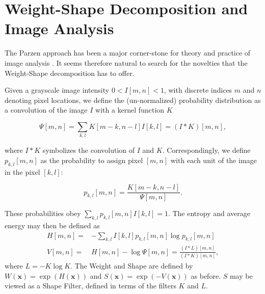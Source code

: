 \documentclass[preprint,12pt]{elsarticle}
\begin{document}
\section{Weight-Shape Decomposition and Image Analysis}
\label{image}
The Parzen approach has been a major corner-stone for theory and practice of image analysis \cite{lindeberg1994}. It seems therefore natural to search for the novelties that the Weight-Shape decomposition has to offer.

Given a grayscale image intensity $0< I[m, n] <1$, with discrete indices $m$ and $n$ denoting pixel locations,  we define the (un-normalized) probability distribution as a convolution of the image $I$ with a kernel function $K$

\begin{equation}\label{psi_image}
  \Psi[m,n]=\sum_{k,l}K[m-k,n-l]I[k,l]=\left(I\ast K\right)[m,n],
\end{equation}

where $I\ast K$ symbolizes the convolution of $I$ and $K$. Correspondingly, we define $p_{k,l}[m,n]$ as the probability to assign pixel $[m,n]$ with each unit of the image in the pixel $[k,l]$:

\begin{equation}\label{prob_image}
  p_{k,l}[m,n]=\frac{K[m-k,n-l]}{\Psi[m,n]}.
\end{equation}

These probabilities obey $\sum_{k,l}p_{k,l}[m,n]I[k,l]=1$. The entropy and average energy may then be defined as
\begin{equation}\label{H_V_image}
\begin{aligned}
  H[m,n]=&-\sum_{k,l}I[k,l]p_{k,l}[m,n]\log p_{k,l}[m,n]\\
  V[m,n]=&H[m,n]-\log \Psi[m,n]=\frac{\left(I\ast L\right)[m,n]}{\left(I\ast K\right)[m,n]},
\end{aligned}
\end{equation}
where $L=-K\log K$. The Weight and Shape are defined by $W\left(\mathbf{x}\right)=\exp\left(H\left(\mathbf{x}\right)\right)$ and $S\left(\mathbf{x}\right)=\exp\left(-V\left(\mathbf{x}\right)\right)$ as before. $S$ may be viewed as a Shape Filter, defined in terms of the filters $K$ and $L$.
\end{document}

